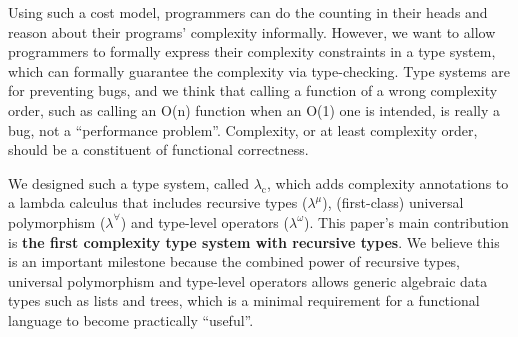 \documentclass[preprint]{sigplanconf}
\newcommand{\logo}{\lambda_\mathrm{c}}
\begin{document}
Using such a cost model, programmers can do the counting in their heads and reason about their programs' complexity informally. However, we want to allow programmers to formally express their complexity constraints in a type system, which can formally guarantee the complexity via type-checking. Type systems are for preventing bugs, and we think that calling a function of a wrong complexity order, such as calling an O(n) function when an O(1) one is intended, is really a bug, not a ``performance problem''. Complexity, or at least complexity order, should be a constituent of functional correctness.

We designed such a type system, called $\logo$, which adds complexity annotations to a lambda calculus that includes recursive types ($\lambda^\mu$), (first-class) universal polymorphism ($\lambda^\forall$) and type-level operators ($\lambda^\omega$). This paper's main contribution is {\bf the first complexity type system with recursive types}. We believe this is an important milestone because the combined power of recursive types, universal polymorphism and type-level operators allows generic algebraic data types such as lists and trees, which is a minimal requirement for a functional language to become practically ``useful''.
\end{document}
